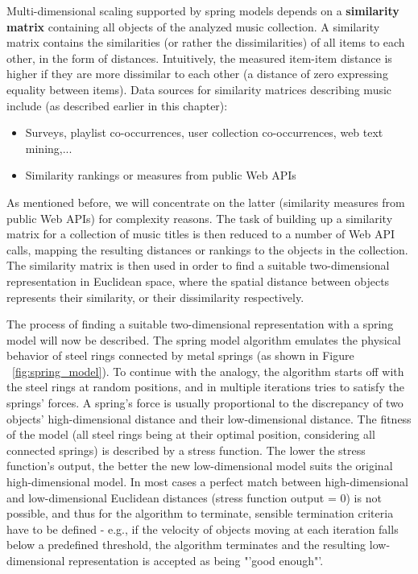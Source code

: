 Multi-dimensional scaling supported by spring models depends on a \textbf{similarity matrix} containing all objects of the analyzed music collection. A similarity matrix contains the similarities (or rather the dissimilarities) of all items to each other, in the form of distances. Intuitively, the measured item-item distance is higher if they are more dissimilar to each other (a distance of zero expressing equality between items). Data sources for similarity matrices describing music include 
(as described earlier in this chapter):
\begin{itemize}
	\item Surveys, playlist co-occurrences, user collection co-occurrences, web text mining,... 
	\item Similarity rankings or measures from public Web APIs
\end{itemize}
As mentioned before, we will concentrate on the latter (similarity measures from public Web APIs) for complexity reasons. The task of building up a similarity matrix for a collection of music titles is then reduced to a number of Web API calls, mapping the resulting distances or rankings to the objects in the collection. The similarity matrix is then used in order to find a suitable two-dimensional representation in Euclidean space, where the spatial distance between objects represents their similarity, or their dissimilarity respectively.

The process of finding a suitable two-dimensional representation with a spring model will now be described. The spring model algorithm emulates the physical behavior of steel rings connected by metal springs (as shown in Figure ~\ref{fig:spring_model}). To continue with the analogy, the algorithm starts off with the steel rings at random positions, and in multiple iterations tries to satisfy the springs' forces. A spring's force is usually proportional to the discrepancy of two objects' high-dimensional distance and their low-dimensional distance. The fitness of the model (all steel rings being at their optimal position, considering all connected springs) is described by a stress function. The lower the stress function's output, the better the new low-dimensional model suits the original high-dimensional model. In most cases a perfect match between high-dimensional and low-dimensional Euclidean distances (stress function output = 0) is not possible, and thus for the algorithm to terminate, sensible termination criteria have to be defined - e.g., if the velocity of objects moving at each iteration falls below a predefined threshold, the algorithm terminates and the resulting low-dimensional representation is accepted as being "'good enough"'.

